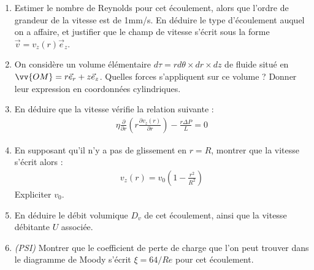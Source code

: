 \begin{enumerate}

	\item Estimer le nombre de Reynolds pour cet écoulement, alors que l'ordre de grandeur de la vitesse est de 1mm/s. En déduire le type d'écoulement auquel on a affaire, et justifier que le champ de vitesse s'écrit sous la forme $\vec{v}=v_z(r)\vec{e}_z$.

	\item On considère un volume élémentaire $d\tau=rd\theta\times dr\times dz$ de fluide situé en $\vv{OM}=r\vec{e}_r+z\vec{e}_z$. Quelles forces s'appliquent sur ce volume ? Donner leur expression en coordonnées cylindriques. 
	
	\item En déduire que la vitesse vérifie la relation suivante : 
	\begin{align*}
		\eta\frac{\partial}{\partial r}\left( r\frac{\partial v_z(r)}{\partial r}\right) -\frac{r\Delta P}{L}=0
	\end{align*}

	\item En supposant qu'il n'y a pas de glissement en $r=R$, montrer que la vitesse s'écrit alors :
	\begin{align*}
		v_z(r)=v_0\left(1-\frac{r^2}{R^2} \right) 
	\end{align*}
	Expliciter $v_0$.
	
	\item En déduire le débit volumique $D_v$ de cet écoulement, ainsi que la vitesse débitante $U$ associée. 
	
	\item \textit{(PSI)} Montrer que le coefficient de perte de charge que l'on peut trouver dans le diagramme de Moody s'écrit $\xi=64/Re$ pour cet écoulement.
		
\end{enumerate}

\newpage

